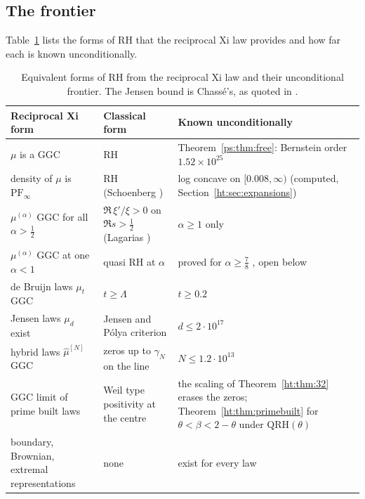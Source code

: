 \subsection{The frontier}
Table~\ref{ht:tab:frontier} lists the forms of RH that the reciprocal Xi law provides and how far each is known unconditionally.

\begin{table}[ht]
\centering\scriptsize\setlength{\tabcolsep}{3pt}
\begin{tabular}{p{3.1cm}p{3.1cm}p{3.1cm}}
\toprule
Reciprocal Xi form & Classical form & Known unconditionally \\
\midrule
$\mu$ is a GGC & RH & Theorem~\ref{ps:thm:free}: Bernstein order $1.52\times10^{25}$ \\
density of $\mu$ is $\mathrm{PF}_\infty$ & RH (Schoenberg \cite{Schoenberg51}) & log concave on $[0.008,\infty)$ (computed, Section~\ref{ht:sec:expansions}) \\
$\mu^{(\alpha)}$ GGC for all $\alpha>\frac12$ & $\Re\,\xi'/\xi>0$ on $\Re s>\frac12$ (Lagarias \cite{Lagarias}) & $\alpha\ge1$ only \\
$\mu^{(\alpha)}$ GGC at one $\alpha<1$ & quasi RH at $\alpha$ & proved for $\alpha\ge\frac78$ \cite{OAI26a}, open below \\
de Bruijn laws $\mu_t$ GGC & $t\ge\Lambda$ & $t\ge0.2$ \cite{PT21} \\
Jensen laws $\mu_d$ exist & Jensen and P\'olya criterion & $d\le2\cdot10^{17}$ \cite{GORZ19} \\
hybrid laws $\hat\mu^{[N]}$ GGC & zeros up to $\gamma_N$ on the line & $N\le1.2\cdot10^{13}$ \\
GGC limit of prime built laws & Weil type positivity at the centre & the scaling of Theorem~\ref{ht:thm:32} erases the zeros; Theorem~\ref{ht:thm:primebuilt} for $\theta<\beta<2-\theta$ under $\mathrm{QRH}(\theta)$ \\
boundary, Brownian, extremal representations & none & exist for every law \\
\bottomrule
\end{tabular}
\caption{Equivalent forms of RH from the reciprocal Xi law and their unconditional frontier. The Jensen bound is Chass\'e's, as quoted in \cite{GORZ19}.}\label{ht:tab:frontier}
\end{table}

